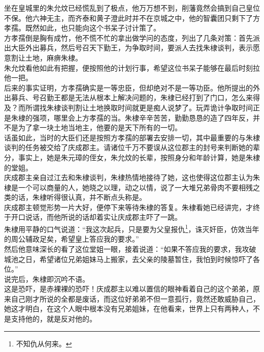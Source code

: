\begin{multicols}{\theparacolNo}
坐在皇城里的朱允炆已经慌乱到了极点，他万万想不到，削藩竟然会搞到自己皇位不保。他六神无主，而齐泰和黄子澄此时并不在京城之中，他的智囊团只剩下了方孝孺。既然如此，也只能向这个书呆子讨计策了。\\

方孝孺倒是胸有成竹，他不慌不忙的拿出做学问的态度，列出了几条对策：首先派出大臣外出募兵，然后号召天下勤王，为争取时间，要派人去找朱棣谈判，表示愿意割让土地，麻痹朱棣。\\

朱允炆看他如此有把握，便按照他的计划行事，希望这位书呆子能够在最后时刻拉他一把。\\

后来的事实证明，方孝孺确实是一等忠臣，但却绝对不是一等功臣。他所提出的外出募兵、号召勤王都是无法从根本上解决问题的，朱棣已经打到了门口，怎么来得及？而所谓找朱棣谈判割让土地换取时间就更是痴人说梦了。玩弄诡计争取时间正是朱棣的强项，哪里会上方孝孺的当。朱棣辛辛苦苦，勤勤恳恳的造了四年反，并不是为了拿一块土地当地主，他要的是天下所有的一切。\\

话虽如此，当时的大臣们还是按照方孝孺的部署去安排一切，其中最重要的与朱棣谈判的任务被交给了庆成郡主。请诸位千万不要误从这位郡主的封号来判断她的辈分，事实上，她是朱元璋的侄女，朱允炆的长辈，按照身分和年龄计算，她是朱棣的堂姐。\\

庆成郡主亲自过江去和朱棣谈判，朱棣热情地接待了她，这也使得这位郡主认为朱棣是一个可以商量的人，她晓之以理，动之以情，说了一大堆兄弟骨肉不要相残之类的话，朱棣听得很认真，并不断点头称是。\\

庆成郡主顿觉形势一片大好，便停下来等待朱棣的答复。朱棣看她已经讲完，才终于开口说话，而他所说的话却着实让庆成郡主吓了一跳。\\

朱棣用平静的口气说道：“我这次起兵，只是要为父皇报仇\footnote{不知仇从何来。}，诛灭奸臣，仿效当年的周公辅政足矣，希望皇上答应我的要求。”\\

然后他意味深长的看了这位堂姐一眼，接着说道：“如果不答应我的要求，我攻破城池之日，希望诸位兄弟姐妹马上搬家，去父亲的陵墓暂住，我怕到时候惊吓了各位。”\\

说完后，朱棣即沉吟不语。\\

这是恐吓，是赤裸裸的恐吓！庆成郡主以难以置信的眼神看着自己的这个弟弟，原来自己刚才所说的全都是废话，而这位好弟弟不但一意孤行，竟然还敢威胁自己，她这才明白，在这个人眼中根本没有兄弟姐妹，在他看来，世界上只有两种人，不是支持他的，就是反对他的。\\


\end{multicols}
